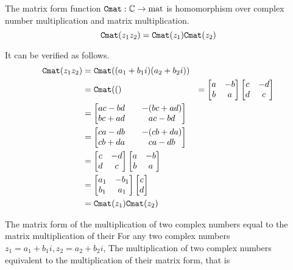 \documentclass[runningheads,a4paper,english]{llncs}[2022/01/12]
\newcommand{\bC}{\mathbb{C}}
\newcommand{\bmatL}{\begin{bmatrix}}
\newcommand{\bmatR}{\end{bmatrix}}
\begin{document}
\begin{lemma}
  The matrix form function $\Cmat:\bC\rightarrow \mathrm{mat}$ is homomorphism over complex number multiplication and matrix multiplication.
  \begin{equation}
    \Cmat{z_1z_2}=\Cmat{z_1}\Cmat{z_2}
  \end{equation}
\end{lemma}
It can be verified as follows.
\begin{equation*}
  \begin{aligned}
    \Cmat{z_1z_2}
    &=\Cmat{(a_1+b_1i)(a_2+b_2i)}\\
    &=\Cmat{(}
    &=\bmatL a&-b\\b&a\bmatR \bmatL c&-d\\d&c\bmatR  \\
    &=\bmatL ac-bd&\quad -(bc+ad)\\bc+ad&\quad ac-bd\bmatR \\
    &=\bmatL ca-db&\quad -(cb+da)\\cb+da&\quad ca-db\bmatR \\
    &=\bmatL c&-d\\d&c\bmatR \bmatL a&-b\\b&a\bmatR  \\
    &=\bmatL a_1&-b_1\\b_1&a_1\bmatR \bmatL c\\d\bmatR\\
    &=\Cmat{z_1}\Cmat{z_2}
  \end{aligned}
\end{equation*}

  The matrix form of the multiplication of two complex numbers equal to the matrix multiplication of their 
  For any two complex numbers $z_1=a_1+b_1i, z_2=a_2+b_2i$,
  The multiplication of two complex numbers equivalent to the multiplication of their matrix form, that is

  
\end{document}
